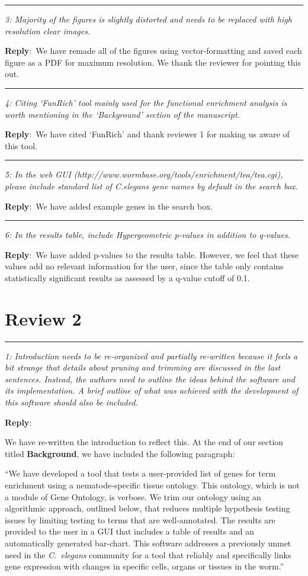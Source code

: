 \documentclass[12pt,stdletter,orderfromtodate,sigleft]{newlfm}
\newcommand{\pointRaised}[2]{\medskip \hrule \noindent 
                \textsl{{\fontseries{b} #1}: #2}}
\newcommand{\reply}{\noindent \textbf{Reply}:\ }
\begin{document}
\begin{newlfm}
\pointRaised{3}{Majority of the figures is slightly distorted and needs to be replaced with high resolution clear images.}

\reply{We have remade all of the figures using vector-formatting and saved each figure as a PDF for maximum resolution. We thank the reviewer for pointing this out.}

\pointRaised{4}{Citing ‘FunRich’ tool mainly used for the functional enrichment analysis is worth mentioning in the ‘Background’ section of the manuscript.
}

\reply{We have cited `FunRich' and thank reviewer 1 for making us aware of this tool.}

\pointRaised{5}{In the web GUI (http://www.wormbase.org/tools/enrichment/tea/tea.cgi), please include standard list of C.elegans gene names by default in the search box.}

\reply{We have added example genes in the search box.
}

\pointRaised{6}{In the results table, include Hypergeometric p-values in addition to q-values.}

\reply{We have added p-values to the results table. However, we feel that these values add no relevant information for the user, since the table only contains statistically significant results as assessed by a q-value cutoff of 0.1.}


\section{Review 2}

\pointRaised{1}{Introduction needs to be re-organized and partially re-written because it feels a bit strange that details about pruning and trimming are discussed in the last sentences. Instead, the authors need to outline the ideas behind the software and its implementation. A brief outline of what was achieved with the development of this software should also be included.}

\reply{We have re-written the introduction to reflect this. At the end of our section titled \textbf{Background}, we have included the following paragraph:

``We have developed a tool that tests a user-provided list of genes for term enrichment using a nematode-specific tissue ontology. This ontology, which is not a module of Gene Ontology, is verbose. We trim our ontology using an algorithmic approach, outlined below, that reduces multiple hypothesis testing issues by limiting testing to terms that are well-annotated. The results are provided to the user in a GUI that includes a table of results and an automatically generated bar-chart. This software addresses a previously unmet need in the \emph{C.~elegans} community for a tool that reliably and specifically links gene expression with changes in specific cells, organs or tissues in the worm.''
}


\end{newlfm}
\end{document}

